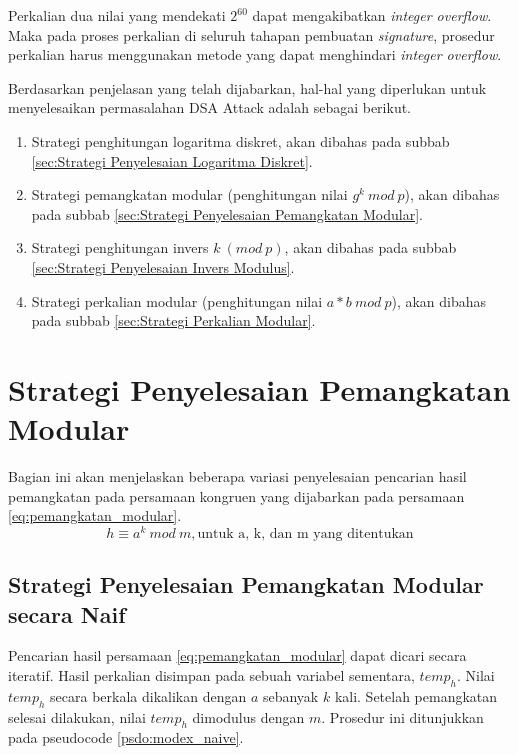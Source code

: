 Perkalian dua nilai yang mendekati $2^{60}$ dapat mengakibatkan \textit{integer overflow}. Maka pada proses perkalian di seluruh tahapan pembuatan \textit{signature}, prosedur perkalian harus menggunakan metode yang dapat menghindari \textit{integer overflow}.

Berdasarkan penjelasan yang telah dijabarkan, hal-hal yang diperlukan untuk menyelesaikan permasalahan DSA Attack adalah sebagai berikut.

\begin{enumerate}
	\item Strategi penghitungan logaritma diskret, akan dibahas pada subbab \ref{sec:Strategi Penyelesaian Logaritma Diskret}.
	\item Strategi pemangkatan modular (penghitungan nilai $ g^k\ mod\ p $), akan dibahas pada subbab \ref{sec:Strategi Penyelesaian Pemangkatan Modular}.
	\item Strategi penghitungan invers $ k\ (mod\ p) $, akan dibahas pada subbab \ref {sec:Strategi Penyelesaian Invers Modulus}.
	\item Strategi perkalian modular (penghitungan nilai $ a * b\ mod\ p $), akan dibahas pada subbab \ref{sec:Strategi Perkalian Modular}.
\end{enumerate}

\section{Strategi Penyelesaian Pemangkatan Modular}
Bagian ini akan menjelaskan beberapa variasi penyelesaian pencarian hasil pemangkatan pada persamaan kongruen yang dijabarkan pada persamaan \eqref{eq:pemangkatan_modular}.
\begin{equation}
h \equiv a^k\ mod\ m,\text{untuk a, k, dan m yang ditentukan}
\label{eq:pemangkatan_modular}
\end{equation}

\subsection{Strategi Penyelesaian Pemangkatan Modular secara Naif}
Pencarian hasil persamaan \eqref{eq:pemangkatan_modular} dapat dicari secara iteratif. Hasil perkalian disimpan pada sebuah variabel sementara, $temp_h$. Nilai $temp_h$ secara berkala dikalikan dengan $a$ sebanyak $k$ kali. Setelah pemangkatan selesai dilakukan, nilai $temp_h$ dimodulus dengan $ m $. Prosedur ini ditunjukkan pada pseudocode \ref{psdo:modex_naive}.

